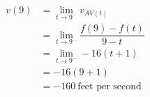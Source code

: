 \documentclass{ximera}
\begin{document}
\begin{problem}
\begin{enumerate}
\begin{explanation}
		\begin{align*}		 
		v(9)&=\lim_{t \to 9^{-}}v_{AV(t)}\\
		&=\lim_{t \to 9^{-}}\dfrac{f(9)-f(t)}{9-t}\\
            &=\lim_{t \to 9^{-}}-16(t+1)\\
            &=-16(9+1)\\
              &=-160 \  \text{feet per second}
	\end{align*}
     		\end{explanation}			
		\end{enumerate}	
\end{problem}
\end{document}
